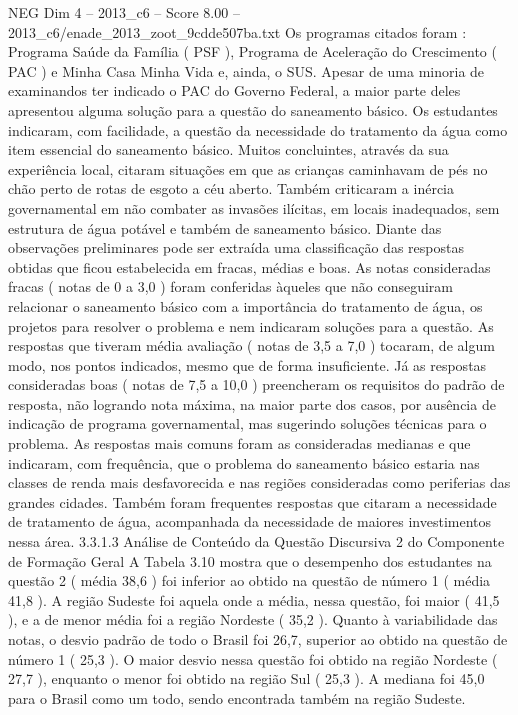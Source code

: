 \begin{textsample}{NEG Dim 4 – 2013\_c6 – Score 8.00 – 2013\_c6/enade\_2013\_zoot\_9cdde507ba.txt}
Os programas citados foram : Programa Saúde da Família ( PSF ), Programa de Aceleração do Crescimento ( PAC ) e Minha Casa Minha Vida e, ainda, o SUS.
Apesar de uma minoria de examinandos ter indicado o PAC do Governo Federal, a maior parte deles apresentou alguma solução para a questão do saneamento básico.
Os estudantes indicaram, com facilidade, a questão da necessidade do tratamento da água como item essencial do saneamento básico.
Muitos concluintes, através da sua experiência local, citaram situações em que as crianças caminhavam de pés no chão perto de rotas de esgoto a céu aberto.
Também criticaram a inércia governamental em não combater as invasões ilícitas, em locais inadequados, sem estrutura de água potável e também de saneamento básico.
Diante das observações preliminares pode ser extraída uma classificação das respostas obtidas que ficou estabelecida em fracas, médias e boas.
As notas consideradas fracas ( notas de 0 a 3,0 ) foram conferidas àqueles que não conseguiram relacionar o saneamento básico com a importância do tratamento de água, os projetos para resolver o problema e nem indicaram soluções para a questão.
As respostas que tiveram média avaliação ( notas de 3,5 a 7,0 ) tocaram, de algum modo, nos pontos indicados, mesmo que de forma insuficiente.
Já as respostas consideradas boas ( notas de 7,5 a 10,0 ) preencheram os requisitos do padrão de resposta, não logrando nota máxima, na maior parte dos casos, por ausência de indicação de programa governamental, mas sugerindo soluções técnicas para o problema.
As respostas mais comuns foram as consideradas medianas e que indicaram, com frequência, que o problema do saneamento básico estaria nas classes de renda mais desfavorecida e nas regiões consideradas como periferias das grandes cidades.
Também foram frequentes respostas que citaram a necessidade de tratamento de água, acompanhada da necessidade de maiores investimentos nessa área. 3.3.1.3 Análise de Conteúdo da Questão Discursiva 2 do Componente de Formação Geral A Tabela 3.10 mostra que o desempenho dos estudantes na questão 2 ( média 38,6 ) foi inferior ao obtido na questão de número 1 ( média 41,8 ).
A região Sudeste foi aquela onde a média, nessa questão, foi maior ( 41,5 ), e a de menor média foi a região Nordeste ( 35,2 ).
Quanto à variabilidade das notas, o desvio padrão de todo o Brasil foi 26,7, superior ao obtido na questão de número 1 ( 25,3 ).
O maior desvio nessa questão foi obtido na região Nordeste ( 27,7 ), enquanto o menor foi obtido na região Sul ( 25,3 ).
A mediana foi 45,0 para o Brasil como um todo, sendo encontrada também na região Sudeste.

\end{textsample}
